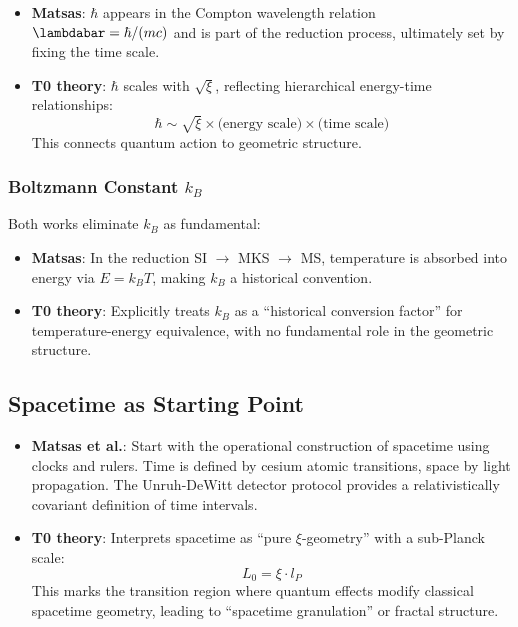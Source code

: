 	\begin{itemize}
		\item \textbf{Matsas}: $\hbar$ appears in the Compton wavelength relation $\lambdabar = \hbar/(mc)$ and is part of the reduction process, ultimately set by fixing the time scale.
		
		\item \textbf{T0 theory}: $\hbar$ scales with $\sqrt{\xi}$, reflecting hierarchical energy-time relationships:
		\[
		\hbar \sim \sqrt{\xi} \times \text{(energy scale)} \times \text{(time scale)}
		\]
		This connects quantum action to geometric structure.
	\end{itemize}
	
	\subsubsection{Boltzmann Constant $k_B$}
	
	Both works eliminate $k_B$ as fundamental:
	
	\begin{itemize}
		\item \textbf{Matsas}: In the reduction SI $\to$ MKS $\to$ MS, temperature is absorbed into energy via $E = k_B T$, making $k_B$ a historical convention.
		
		\item \textbf{T0 theory}: Explicitly treats $k_B$ as a ``historical conversion factor'' for temperature-energy equivalence, with no fundamental role in the geometric structure.
	\end{itemize}
	
	\subsection{Spacetime as Starting Point}
	
	\begin{itemize}
		\item \textbf{Matsas et al.}: Start with the operational construction of spacetime using clocks and rulers. Time is defined by cesium atomic transitions, space by light propagation. The Unruh-DeWitt detector protocol provides a relativistically covariant definition of time intervals.
		
		\item \textbf{T0 theory}: Interprets spacetime as ``pure $\xi$-geometry'' with a sub-Planck scale:
		\[
		L_0 = \xi \cdot l_P
		\]
		This marks the transition region where quantum effects modify classical spacetime geometry, leading to ``spacetime granulation'' or fractal structure.
	\end{itemize}
	
